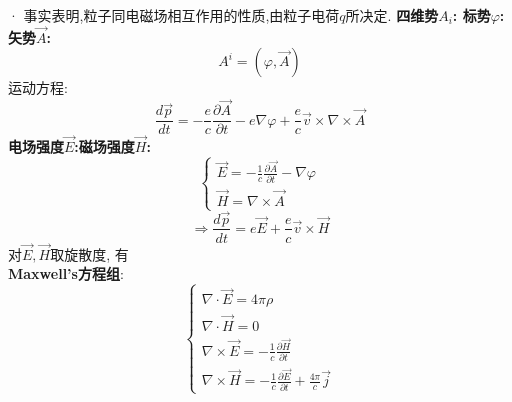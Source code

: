 \documentclass{article}
\begin{document}
· 事实表明,粒子同电磁场相互作用的性质,由粒子电荷$q$所决定.
\textbf{四维势$A_{i}$: \quad 标势$\varphi$: \quad 矢势$\vec A$:}
\[A^{i}=(\varphi,\vec A)\]
运动方程:
\[\frac{d\vec p}{dt} = - \frac{e}{c} \frac{\partial\vec A}{\partial t} - e \nabla \varphi + \frac{e}{c} \vec v \times \nabla \times \vec A\]
\textbf{电场强度$\vec E$:\quad 磁场强度$\vec H$:}
\begin{displaymath}
    \left\{ \begin{array}{ll}
    \vec E = -\frac{1}{c} \frac{\partial \vec A}{\partial t} - \nabla \varphi\\
    \vec H = \nabla \times \vec A
    \end{array} \right.
\end{displaymath}
\[\Rightarrow \frac{d\vec p}{dt} = e \vec E + \frac{e}{c} \vec v \times \vec H\]
对$\vec E,\vec H$取旋散度, 有\\
\textbf{Maxwell's方程组}:
\begin{displaymath}
    \left\{ \begin{array}{ll}
    \nabla \cdot \vec E = 4\pi\rho\\
    \nabla \cdot \vec H = 0\\
    \nabla \times \vec E = - \frac{1}{c} \frac{\partial \vec H}{\partial t}\\
    \nabla \times \vec H = - \frac{1}{c} \frac{\partial \vec E}{\partial t} + \frac{4\pi}{c}\vec j
    \end{array} \right.
\end{displaymath}
\end{document}
